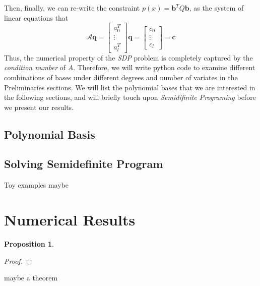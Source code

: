\documentclass[12pt]{amsart}
\numberwithin{equation}{section}
\newtheorem{prop}[thm]{Proposition}
\theoremstyle{definition}
\numberwithin{thm}{section}
\begin{document}
\smallskip
Then, finally, we can re-write the constraint $p(x) = \mathbf{b}^T Q \mathbf{b}$, as the system of linear equations that 
\begin{equation*}
     \mathcal{A} \mathbf{q} = \begin{bmatrix}
          a_0^T \\
          \vdots \\
          a_l^T
     \end{bmatrix} \mathbf{q} = \begin{bmatrix}
          c_0 \\
          \vdots \\
          c_l
     \end{bmatrix} = \mathbf{c}
\end{equation*}
Thus, the numerical property of the \emph{SDP} problem is completely captured by the \emph{condition number} of $A$. 
Therefore, we will write python code to examine different combinations of bases under different degrees and number of variates in the Preliminaries sections. 
We will list the polynomial bases that we are interested in the following sections, and will briefly touch upon \emph{Semidifinite Programing} before we present our results.

\subsection{Polynomial Basis}
\label{Sec:polynomial Basis}

\subsection{Solving Semidefinite Program}
\label{Sec:Solving Semidefinite Program}




Toy examples maybe

\newpage
\section{Numerical Results}


\begin{prop}

\end{prop}

\begin{proof}

\end{proof}

maybe a theorem
\end{document}
